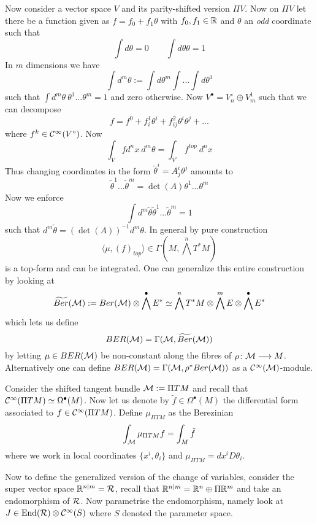 \begin{rem}
  Now consider a vector space $V$ and its parity-shifted version $\Pi V$. Now on $\Pi V$ let there be a function given as $f = f_0 + f_1 \theta$ with $f_0, f_1 \in \mathbb{R}$ and $\theta$ an \emph{odd} coordinate such that
  $$ \int d\theta = 0 \quad  \quad \int d\theta \theta = 1 $$
  In $m$ dimensions we have
  $$ \int d^m \theta := \int d\theta^m \int ... \int d\theta^1 $$
  such that $\int d^m \theta \ \theta^1 ... \theta^m = 1$ and zero otherwise. Now $V^\bullet = V_n^\circ \oplus V^1_m$ such that we can decompose
  $$ f = f^0 + f^1_i \theta^i + f^2_{ij} \theta^i \theta^j + ... $$
  where $f^k \in \mathcal{C}^{\infty}(V^\circ)$. Now
  $$ \int_V f d^nx \ d^m \theta = \int_{V^\circ} f^{top} \ d^n x $$
  Thus changing coordinates in the form $\widetilde{\theta}^i = A^i_j \theta^j$ amounts to
  $$ \widetilde{\theta}^1 ... \widetilde{\theta}^m = \det(A) \theta^1 ... \theta^m $$
  Now we enforce
  $$ \int d^m \widetilde{\theta} \widetilde{\theta}^1 ... \widetilde{\theta}^m = 1 $$
  such that $d^m \widetilde{\theta} = (\det(A))^{-1} d^m \theta$. In general by pure construction
  $$ \langle \mu, (f)_{top} \rangle \in \Gamma(M, \bigwedge^n T^* M) $$
  is a top-form and can be integrated. One can generalize this entire construction by looking at
  \begin{equation}
    \widetilde{Ber}(\mathcal{M}) := Ber(\mathcal{M}) \otimes \bigwedge^\bullet E^* \simeq \bigwedge^n T^*M \otimes \bigwedge^m E \otimes \bigwedge^\bullet E^*
  \end{equation}
  which lets us define
  \begin{equation}
    BER(\mathcal{M}) = \Gamma(\mathcal{M}, \widetilde{Ber}(\mathcal{M}))
  \end{equation}
  by letting $\mu \in BER(\mathcal{M})$ be non-constant along the fibres of $\rho \colon \mathcal{M} \longrightarrow M$. Alternatively one can define $BER(\mathcal{M})= \Gamma(\mathcal{M}, \rho^*Ber(\mathcal{M}))$ as a $\mathcal{C}^{\infty}(\mathcal{M})$-module.

  \begin{example}
    Consider the shifted tangent bundle $\mathcal{M} := \Pi TM$ and recall that $\mathcal{C}^{\infty}(\Pi TM) \simeq \Omega^\bullet(M)$. Now let us denote by $\tilde{f} \in \Omega^\bullet(M)$ the differential form associated to $f \in \mathcal{C}^{\infty}(\Pi TM)$. Define $\mu_{\Pi TM}$ as the Berezinian
    $$ \int_{\mathcal{M}} \mu_{\Pi TM} f = \int_M \tilde{f} $$
    where we work in local coordinates $\{x^i, \theta_i\}$ and $\mu_{\Pi TM} = dx^i D\theta_i$.
  \end{example}

  Now to define the generalized version of the change of variables, consider the super vector space $\mathbb{R}^{n|m} = \mathcal{R}$, recall that $\mathbb{R}^{n|m} = \mathbb{R}^n \oplus \Pi \mathbb{R}^m$ and take an endomorphism of $\mathcal{R}$. Now parametrise the endomorphism, namely look at $J \in \operatorname{End}(\mathcal{R}) \otimes \mathcal{C}^{\infty}(S)$ where $S$ denoted the parameter space.


\end{rem}
